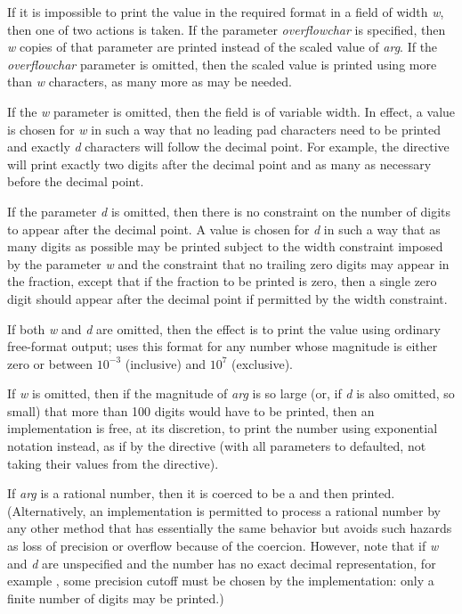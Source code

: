 \begin{flushdesc}
If it is impossible to print the value in the required format in a field
of width {\it w}, then one of two actions is taken.  If the
parameter {\it overflowchar} is specified, then {\it w} copies of that
parameter are printed instead of the scaled value of {\it arg}.
If the {\it overflowchar} parameter is omitted, then the scaled value
is printed using more than {\it w} characters, as many more as may be
needed.

If the {\it w} parameter is omitted, then the field is of variable width.
In effect, a value is chosen
for {\it w} in such a way that no leading pad characters need to be printed
and exactly {\it d} characters will follow the decimal point.
For example, the directive  will print exactly
two digits after the decimal point and as many as necessary before the
decimal point.

If the parameter {\it d} is omitted, then there is no constraint
on the number of digits to appear after the decimal point.
A value is chosen for {\it d} in such a way that as many digits
as possible may be printed subject to the width constraint
imposed by the parameter {\it w} and the constraint that no trailing
zero digits may appear in the fraction, except that if the
fraction to be printed is zero, then a single zero digit should
appear after the decimal point if permitted by the width constraint.

If both {\it w} and {\it d} are omitted, then the effect is to print
the value using ordinary free-format output;  uses this format
for any number whose magnitude is either zero or between
$10^{-3}$ (inclusive) and $10^7$ (exclusive).

If {\it w} is omitted, then if the magnitude of {\it arg} is so large (or, if
{\it d} is also omitted, so small) that more than 100 digits would have to
be printed, then an implementation is free, at its discretion, to print
the number using exponential notation instead, as if by the directive
 (with all parameters to  defaulted, not
taking their values from the  directive).

If {\it arg} is a rational number, then it is coerced to be a 
and then printed.  (Alternatively, an implementation is permitted to
process a rational number by any other method that has essentially the
same behavior but avoids such hazards as loss of precision or overflow
because of the coercion.  However, note that if {\it w} and {\it d} are
unspecified and the number has no exact decimal representation,
for example , some precision cutoff must be chosen
by the implementation: only a finite number of digits may be printed.)


\end{flushdesc}
